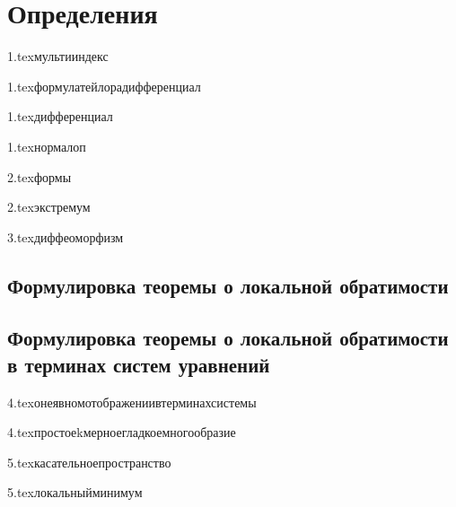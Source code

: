 

\usepackage{sectsty}

\allsectionsfont{\raggedright}
\subsectionfont{\fontsize{14}{15}\selectfont}

\cfoot{}
\rfoot{}




\section{Определения}

{1.tex}{мультииндекс}

{1.tex}{формулатейлорадифференциал}

{1.tex}{дифференциал}

{1.tex}{нормалоп}

{2.tex}{формы}

{2.tex}{экстремум}

{3.tex}{диффеоморфизм}

\subsection{Формулировка теоремы о локальной обратимости}

\subsection{Формулировка теоремы о локальной обратимости в терминах систем уравнений}

{4.tex}{онеявномотображениивтерминахсистемы}

{4.tex}{простоеkмерноегладкоемногообразие}

{5.tex}{касательноепространство}

{5.tex}{локальныйминимум}

